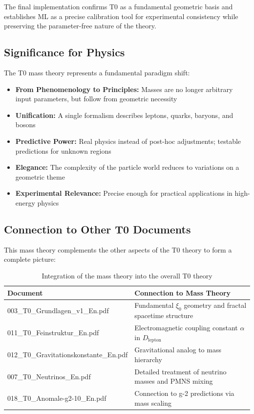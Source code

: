 	The final implementation confirms T0 as a fundamental geometric basis and establishes ML as a precise calibration tool for experimental consistency while preserving the parameter-free nature of the theory.
	
	\subsection{Significance for Physics}
	
	The T0 mass theory represents a fundamental paradigm shift:
	
	\begin{itemize}
		\item \textbf{From Phenomenology to Principles:} Masses are no longer arbitrary input parameters, but follow from geometric necessity
		
		\item \textbf{Unification:} A single formalism describes leptons, quarks, baryons, and bosons
		
		\item \textbf{Predictive Power:} Real physics instead of post-hoc adjustments; testable predictions for unknown regions
		
		\item \textbf{Elegance:} The complexity of the particle world reduces to variations on a geometric theme
		
		\item \textbf{Experimental Relevance:} Precise enough for practical applications in high-energy physics
	\end{itemize}
	
	\subsection{Connection to Other T0 Documents}
	
	This mass theory complements the other aspects of the T0 theory to form a complete picture:
	
	\begin{table}[h]
		\centering
		\small
		\begin{tabular}{lp{10cm}}
			\toprule
			\textbf{Document} & \textbf{Connection to Mass Theory} \\
			\midrule
			003\_T0\_Grundlagen\_v1\_En.pdf & Fundamental $\xi_0$ geometry and fractal spacetime structure \\
			011\_T0\_Feinstruktur\_En.pdf & Electromagnetic coupling constant $\alpha$ in $D_{\text{lepton}}$ \\
			012\_T0\_Gravitationskonstante\_En.pdf & Gravitational analog to mass hierarchy \\
			007\_T0\_Neutrinos\_En.pdf & Detailed treatment of neutrino masses and PMNS mixing \\
			018\_T0\_Anomale-g2-10\_En.pdf & Connection to g-2 predictions via mass scaling \\
			\bottomrule
		\end{tabular}
		\caption{Integration of the mass theory into the overall T0 theory}
		\label{tab:integration}
	\end{table}
	
